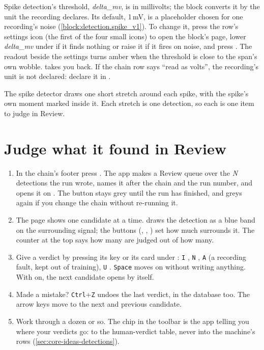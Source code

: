 \begin{watchout}
Spike detection's threshold, \emph{delta\_mv}, is in millivolts; the block converts it by
the unit the recording declares. Its default, 1\,mV, is a placeholder chosen for one
recording's noise (\cref{block:detection.spike_v1}).  To change it, press the row's settings icon
(the first of the four small icons) to open the block's page, lower \emph{delta\_mv} under
 if it finds nothing or raise it if it fires on noise, and press . The readout beside the settings turns amber when the threshold is close to the
span's own wobble.  takes you back. If the chain row says ``read as volts'',
the recording's unit is not declared: declare it in .
\end{watchout}

The spike detector draws one short stretch around each spike, with the spike's own moment
marked inside it. Each stretch is one detection, so each is one item to judge in Review.

\section{Judge what it found in Review}\label{sec:first-session-review}
\begin{enumerate}
  \item In the chain's footer press . The app makes a Review
    queue over the \textit{N} detections the run wrote, names it after the chain and the run
    number, and opens it on . The button stays grey until the run
    has finished, and greys again if you change the chain without re-running it.
  \item The page shows one candidate at a time.  draws the detection
    as a blue band on the surrounding signal; the  buttons (,
    , ) set how much surrounds it. The counter at the top says how many
    are judged out of how many.
  \item Give a verdict by pressing its key or its card under :
    \texttt{I} , \texttt{N} , \texttt{A} 
    (a recording fault, kept out of training), \texttt{U} . \texttt{Space}
     moves on without writing anything. With  on, the next
    candidate opens by itself.
  \item Made a mistake? \texttt{Ctrl}+\texttt{Z} undoes the last verdict, in the database
    too. The arrow keys move to the next and previous candidate.
  \item Work through a dozen or so. The chip  in the toolbar is
    the app telling you where your verdicts go: to the human-verdict table, never into the
    machine's rows (\cref{sec:core-ideas-detections}).
\end{enumerate}

